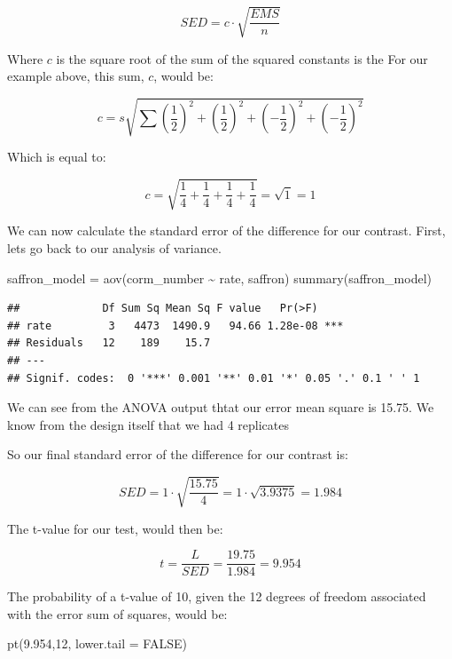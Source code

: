 \documentclass[
]{book}
\newenvironment{Shaded}{\begin{snugshade}}{\end{snugshade}}
\newcommand{\AttributeTok}[1]{\textcolor[rgb]{0.77,0.63,0.00}{#1}}
\newcommand{\ConstantTok}[1]{\textcolor[rgb]{0.00,0.00,0.00}{#1}}
\newcommand{\DecValTok}[1]{\textcolor[rgb]{0.00,0.00,0.81}{#1}}
\newcommand{\FloatTok}[1]{\textcolor[rgb]{0.00,0.00,0.81}{#1}}
\newcommand{\FunctionTok}[1]{\textcolor[rgb]{0.00,0.00,0.00}{#1}}
\newcommand{\NormalTok}[1]{#1}
\newcommand{\OtherTok}[1]{\textcolor[rgb]{0.56,0.35,0.01}{#1}}
\newcommand{\SpecialCharTok}[1]{\textcolor[rgb]{0.00,0.00,0.00}{#1}}
\begin{document}
\[ SED = c \cdot \sqrt{\frac{EMS}{n}} \]

Where \(c\) is the square root of the sum of the squared constants is the For our example above, this sum, \(c\), would be:

\[ c = s\sqrt{\sum (\frac{1}{2})^2 + (\frac{1}{2})^2 + (- \frac{1}{2})^2 + (- \frac{1}{2})^2} \]

Which is equal to:

\[ c = \sqrt{\frac{1}{4} + \frac{1}{4} +\frac{1}{4} +\frac{1}{4}} = \sqrt{1} = 1\]

We can now calculate the standard error of the difference for our contrast. First, lets go back to our analysis of variance.

\begin{Shaded}
\begin{Highlighting}[]
\NormalTok{saffron\_model }\OtherTok{=} \FunctionTok{aov}\NormalTok{(corm\_number }\SpecialCharTok{\textasciitilde{}}\NormalTok{ rate, saffron)}
\FunctionTok{summary}\NormalTok{(saffron\_model)}
\end{Highlighting}
\end{Shaded}

\begin{verbatim}
##             Df Sum Sq Mean Sq F value   Pr(>F)    
## rate         3   4473  1490.9   94.66 1.28e-08 ***
## Residuals   12    189    15.7                     
## ---
## Signif. codes:  0 '***' 0.001 '**' 0.01 '*' 0.05 '.' 0.1 ' ' 1
\end{verbatim}

We can see from the ANOVA output thtat our error mean square is 15.75. We know from the design itself that we had 4 replicates

So our final standard error of the difference for our contrast is:

\[ SED = 1 \cdot \sqrt{\frac{15.75}{4}} = 1 \cdot \sqrt{3.9375} = 1.984 \]

The t-value for our test, would then be:

\[ t =  \frac{L}{SED} = \frac{19.75}{1.984} = 9.954 \]

The probability of a t-value of 10, given the 12 degrees of freedom associated with the error sum of squares, would be:

\begin{Shaded}
\begin{Highlighting}[]
\FunctionTok{pt}\NormalTok{(}\FloatTok{9.954}\NormalTok{,}\DecValTok{12}\NormalTok{, }\AttributeTok{lower.tail =} \ConstantTok{FALSE}\NormalTok{)}
\end{Highlighting}
\end{Shaded}
\end{document}
